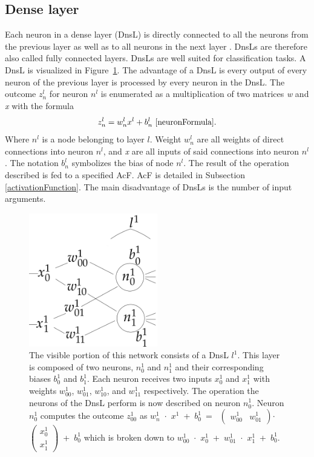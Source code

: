 \subsection{Dense layer}\label{denseLayers}
Each neuron in a dense layer (DnsL) is directly connected to all the neurons from the previous layer as well as to all neurons in the next layer \cite{CNN}. DnsLs are therefore also called fully connected layers. DnsLs are well suited for classification tasks. A DnsL is visualized in Figure~\ref{denseLayerVisualization}. The advantage of a DnsL is every output of every neuron of the previous layer is processed by every neuron in the DnsL. The outcome ${z^l_n}$ for neuron ${n^l}$  is enumerated as a multiplication of two matrices \textit{w} and \textit{x} with the formula \[{z^l_{n}}=w^l_n  x^l + b^l_n~\cite{neuronFormula}\text{.}\] Where ${n^l}$ is a node belonging to layer ${l}$. Weight ${w^l_n}$ are all weights of direct connections into neuron ${n^l}$, and \textit{x} are all inputs of said connections into neuron ${n^l}$. The notation ${b^l_n}$ symbolizes the bias of node ${n^l}$. The result of the operation described is fed to a specified AcF. AcF is detailed in Subsection \ref{activationFunction}. The main disadvantage of DnsLs is the number of input arguments.
\begin{figure}
  \includegraphics[width=0.5\textwidth]{Images/denseLayer.png}
  \caption[rightcaption]{The visible portion of this network consists of a DnsL ${l^1}$. This layer is composed of two neurons, ${n^1_0}$ and ${n^1_1}$ and their corresponding biases ${b^1_0}$ and ${b^1_1}$. Each neuron receives two inputs ${x^1_{0}}$ and ${x^1_{1}}$ with weights ${w^1_{00}}$, ${w^1_{01}}$, ${w^1_{10}}$, and ${w^1_{11}}$ respectively. The operation the neurons of the DnsL perform is now described on neuron ${n^1_{0}}$. Neuron ${n^1_{0}}$ computes the outcome ${z^1_{00}}$ as 
${w^1_{n}}$~$\cdot$~${x^1}$~+~${b^1_0}$~=~
 $\left(\begin{smallmatrix}{w^1_{00}}&{w^1_{01}}\end{smallmatrix}\right)$$\cdot$$\left(\begin{smallmatrix}{x^1_{0}}\\{x^1_{1}}\end{smallmatrix}\right)$~+~${b^1_0}$
which is broken down to ${w^1_{00}}$~$\cdot$~${x^1_{0}}$~+~${w^1_{01}}$~$\cdot$~${x^1_{1}}$~+~${b^1_0}$.
}
  \label{denseLayerVisualization}
\end{figure} 

